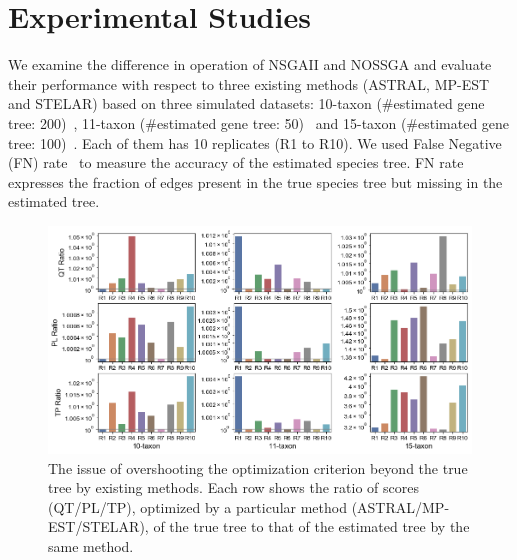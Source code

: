 \section{Experimental Studies}
\label{sec:experiment}
We examine the difference in operation of NSGAII and NOSSGA and evaluate their performance with respect to three existing methods (ASTRAL, MP-EST and STELAR) based on three simulated datasets: 10-taxon (\#estimated gene tree: 200)~\cite{bayzid2015weighted}, 11-taxon (\#estimated gene tree: 50)~\cite{chung2011comparing} and 15-taxon (\#estimated gene tree: 100)~\cite{statistical-binning}. Each of them has 10 replicates (R1 to R10). We used False Negative (FN) rate~\cite{bayzid2013naive} to measure the accuracy of the estimated species tree. FN rate expresses the fraction of edges present in the true species tree but missing in the estimated tree. %

\begin{figure}
	\begin{adjustwidth}{-4cm}{-3cm}
		\centering	
		\includegraphics[width=1.6\textwidth]{Figure/tool_ratio}
		\caption{The issue of overshooting the optimization criterion beyond the true tree by existing methods. Each row shows the ratio of scores (QT/PL/TP), optimized by a particular method (ASTRAL/MP-EST/STELAR), of the true tree to that of the estimated tree by the same method.} \label{fig:tool_ratio}
	\end{adjustwidth}

\end{figure}


